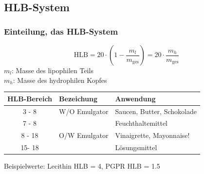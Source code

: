 \documentclass{beamer} %
\begin{document}
\subsection{HLB-System}

\begin{frame}
\frametitle{Einteilung, das HLB-System}
\begin{block}{}
\begin{equation}
\text{HLB} = 20 \cdot \left(1-\frac{m_l}{m_{\text{ges}}}\right) = 20 \cdot \frac{m_h}{m_{\text{ges}}}
\end{equation}
$m_l$: Masse des lipophilen Teils \\
$m_h$: Masse des hydrophilen Kopfes
\end{block}


\pause
\begin{table}[H]
   \centering
   \begin{tabular}{|c|l|l|}
   \hline
   HLB-Bereich & Bezeichung &  Anwendung  \\
   \hline
   3 - 8 & W/O Emulgator & Saucen, Butter, Schokolade \\
   7 - 8 & & Feuchthaltemittel \\
   8 - 18 & O/W Emulgator & Vinaigrette, Mayonnaise! \\
   15- 18 & & Lösungsmittel \\
   \hline   
   \end{tabular}
\end{table}%
\begin{block}{}
Beispielwerte: Lecithin HLB = 4, PGPR HLB = 1.5
\end{block}


\end{frame}
\end{document}
